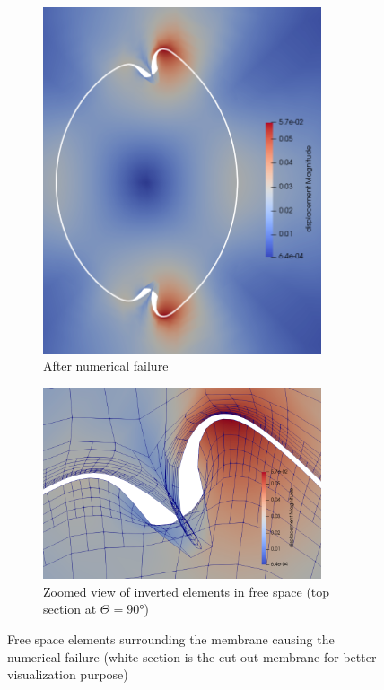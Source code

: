 \documentclass[11pt,a4paper,final]{article}
\begin{document}
\begin{figure}[h]
\centering
\begin{subfigure}{0.4\textwidth}
\centering
\includegraphics[width=0.9\textwidth]{instab_test_1_inv_cells.png}
\caption{After numerical failure}
\label{fig:3.17.1}
\end{subfigure}
\begin{subfigure}{0.58\textwidth}
\centering
\includegraphics[width=0.9\textwidth]{instab_test_1_free_space_inv_cells.png}
\caption{Zoomed view of inverted elements in free space (top section at $\Theta = \ang{90}$)}
\label{fig:3.17.2}
\end{subfigure}
\caption{Free space elements surrounding the membrane causing the numerical failure (white section is the cut-out membrane for better visualization purpose)}
\label{fig:3.17}
\end{figure}
\end{document}
